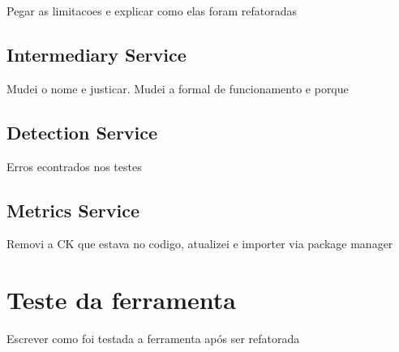 Pegar as limitacoes e explicar como elas foram refatoradas
\subsection{Intermediary Service}
Mudei o nome e justicar. 
Mudei a formal de funcionamento e porque

\subsection{Detection Service}
Erros econtrados nos testes

\subsection{Metrics Service}
Removi a CK que estava no codigo, atualizei e importer via package manager

\section{Teste da ferramenta}

Escrever como foi testada a ferramenta após ser refatorada